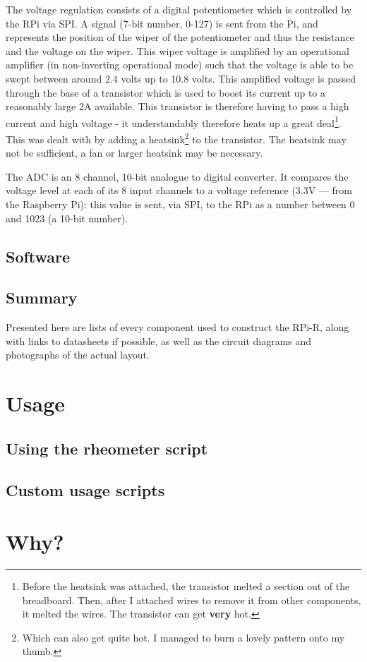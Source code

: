\documentclass{report}
\begin{document}
			The voltage regulation consists of a digital potentiometer which is controlled by the RPi via SPI. A signal (7-bit number, 0-127) is sent from the Pi, and represents the position of the wiper of the potentiometer and thus the resistance and the voltage on the wiper. This wiper voltage is amplified by an operational amplifier (in non-inverting operational mode) such that the voltage is able to be swept between around 2.4 volts up to 10.8 volts. This amplified voltage is passed through the base of a transistor which is used to boost its current up to a reasonably large 2A available. This transistor is therefore having to pass a high current and high voltage - it understandably therefore heats up a great deal\footnote{Before the heatsink was attached, the transistor melted a section out of the breadboard. Then, after I attached wires to remove it from other components, it melted the wires. The transistor can get \textbf{very} hot.}. This was dealt with by adding a heatsink\footnote{Which can also get quite hot. I managed to burn a lovely pattern onto my thumb.} to the transistor. The heatsink may not be sufficient, a fan or larger heatsink may be necessary.
			
			The ADC is an 8 channel, 10-bit analogue to digital converter. It compares the voltage level at each of its 8 input channels to a voltage reference (3.3V --- from the Raspberry Pi): this value is sent, via SPI, to the RPi as a number between 0 and 1023 (a 10-bit number).
			
		
		\section{Software}
		
		\section{Summary}
		
			Presented here are lists of every component used to construct the RPi-R, along with links to datasheets if possible, as well as the circuit diagrams and photographs of the actual layout.
	
	\chapter{Usage}
	
		\section{Using the rheometer script}
		
		\section{Custom usage scripts}
	
	\chapter{}
	
	\chapter{Why?}

	
\end{document}
